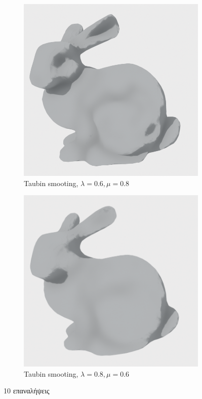 \documentclass{article}
\begin{document}
\begin{figure}[h]
	\begin{subfigure}{0.5\textwidth}
		\includegraphics[width=0.9\linewidth]{"6.png"}
		\caption{Taubin smooting, $\lambda = 0.6, \mu = 0.8$}
	\end{subfigure}
	\begin{subfigure}{0.5\textwidth}
		\includegraphics[width=0.9\linewidth]{"7.png"}
		\caption{Taubin smooting, $\lambda = 0.8, \mu = 0.6$}
	\end{subfigure}
	\caption{10 επαναλήψεις}
\end{figure}
\end{document}
